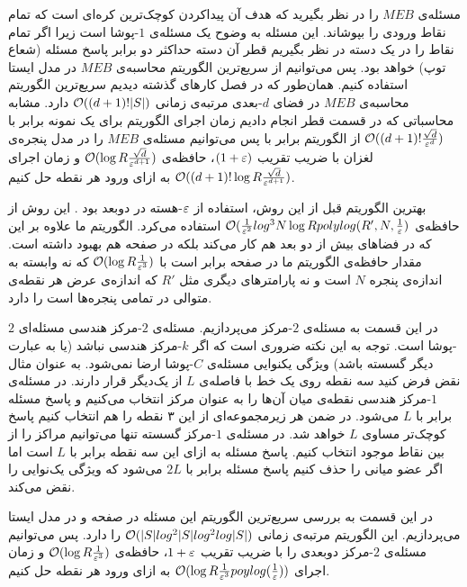 مسئله‌ی $MEB$ را در نظر بگیرید که هدف آن پیدا‌کردن کوچک‌ترین کره‌ای است که تمام نقاط ورودی را بپوشاند. این مسئله به وضوح یک مسئله‌ی $1$-پوشا است زیرا اگر تمام نقاط را در یک دسته در نظر بگیریم قطر آن دسته حداکثر دو برابر پاسخ مسئله (شعاع توپ) خواهد بود. پس می‌توانیم از سریع‌ترین الگوریتم محاسبه‌ی $MEB$ در مدل ایستا استفاده کنیم. همان‌طور که در فصل کارهای گذشته دیدیم سریع‌ترین الگوریتم محاسبه‌ی $MEB$ در فضای $d$-بعدی  مرتبه‌ی زمانی
 $\mathcal{O}((d+1)! |S|)$
  دارد. مشابه محاسباتی که در قسمت قطر انجام دادیم زمان اجرای الگوریتم برای یک نمونه  برابر با 
$ \mathcal{O}((d+1)! \frac{\sqrt{d}}{\varepsilon^d})$
از الگوریتم برابر با پس می‌توانیم مسئله‌ی $MEB$ را در مدل پنجره‌ی لغزان با ضریب تقریب $(1+\varepsilon)$، حافظه‌ی 
$ \mathcal{O}(\log R \frac{\sqrt{d}}{\varepsilon^{d+1}})$
و زمان اجرای
$ \mathcal{O}((d+1)! \log R \frac{\sqrt{d}}{\varepsilon^{d+1}})$
به ازای ورود هر نقطه حل کنیم.

بهترین الگوریتم قبل از این روش، استفاده از $\varepsilon$-هسته در دوبعد بود . این روش از حافظه‌ی 
$ \mathcal{O}(\frac{1}{\varepsilon^2} log^3 N \log R polylog(R', N, \frac{1}{\varepsilon})$
استفاده می‌کرد. الگوریتم ما علاوه بر این که در فضاهای بیش از دو بعد هم کار می‌کند بلکه در صفحه هم بهبود داشته است. مقدار حافظه‌ی الگوریتم ما در صفحه برابر است با
$ \mathcal{O}(\log R \frac{1}{\varepsilon^3})$
که نه وابسته به اندازه‌ی پنجره $N$ است و نه پارامترهای دیگری مثل $R'$ که اندازه‌ی عرض هر نقطه‌ی متوالی در تمامی پنجره‌ها است را دارد.

در این قسمت به مسئله‌ی $2$-مرکز می‌پردازیم. مسئله‌ی $2$-مرکز  هندسی مسئله‌ای $2$-پوشا است.  توجه به این نکته ضروری است که اگر $k$-مرکز هندسی نباشد (یا به عبارت دیگر گسسته باشد) ویژگی یکنوایی مسئله‌ی $C$-پوشا ارضا نمی‌شود. به عنوان مثال نقض فرض کنید سه نقطه روی یک خط با فاصله‌ی $L$ از یک‌دیگر قرار دارند. در مسئله‌ی $1$-مرکز هندسی   نقطه‌ی میان آن‌ها را به عنوان مرکز انتخاب می‌کنیم و پاسخ مسئله برابر با $L$ می‌شود.  در ضمن هر زیر‌مجموعه‌ای از این ۳ نقطه را هم انتخاب کنیم پاسخ کوچک‌تر مساوی $L$ خواهد شد. در مسئله‌ی $1$-مرکز گسسته تنها می‌توانیم مراکز را از بین نقاط موجود انتخاب کنیم. پاسخ مسئله به ازای این سه نقطه برابر با $L$ است اما اگر عضو میانی را حذف کنیم پاسخ مسئله برابر با $2L$ می‌شود که ویژگی یک‌نوایی را نقض می‌کند. 

در این قسمت به بررسی سریع‌ترین الگوریتم این مسئله در صفحه و در مدل ایستا می‌پردازیم. این الگوریتم مرتبه‌ی زمانی 
$ \mathcal{O}(|S| log^2 |S| log ^2 log |S|)$
را دارد. پس می‌توانیم مسئله‌ی $2$-مرکز دوبعدی را با ضریب تقریب $1+\varepsilon$، حافظه‌ی 
$ \mathcal{O}(\log R \frac{1}{\varepsilon^{3}})$
و زمان اجرای
$ \mathcal{O}(\log R \frac{1}{\varepsilon^3} poylog(\frac{1}{\varepsilon}))$
به ازای ورود هر نقطه حل کنیم.

